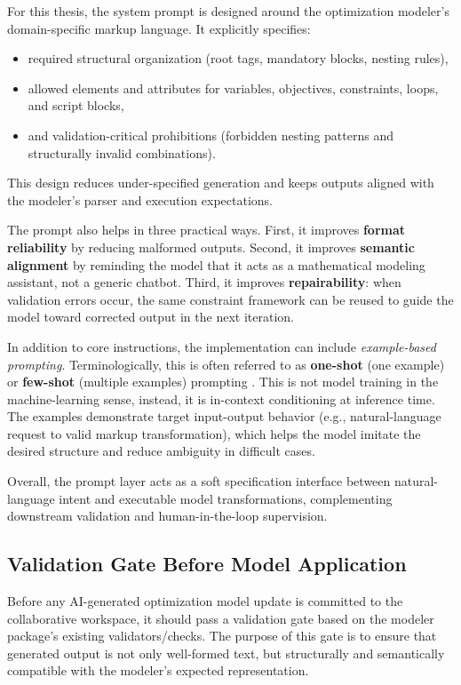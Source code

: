 For this thesis, the system prompt is designed around the optimization modeler's domain-specific markup language. It explicitly specifies:
\begin{itemize}
    \item required structural organization (root tags, mandatory blocks, nesting rules),
    \item allowed elements and attributes for variables, objectives, constraints, loops, and script blocks,
    \item and validation-critical prohibitions (forbidden nesting patterns and structurally invalid combinations).
\end{itemize}
This design reduces under-specified generation and keeps outputs aligned with the modeler's parser and execution expectations.

The prompt also helps in three practical ways. First, it improves \textbf{format reliability} by reducing malformed outputs. Second, it improves \textbf{semantic alignment} by reminding the model that it acts as a mathematical modeling assistant, not a generic chatbot. Third, it improves \textbf{repairability}: when validation errors occur, the same constraint framework can be reused to guide the model toward corrected output in the next iteration.

In addition to core instructions, the implementation can include \emph{example-based prompting}. Terminologically, this is often referred to as \textbf{one-shot} (one example) or \textbf{few-shot} (multiple examples) prompting \cite{brown2020languagemodelsfewshotlearners}. This is not model training in the machine-learning sense, instead, it is in-context conditioning at inference time. The examples demonstrate target input-output behavior (e.g., natural-language request to valid markup transformation), which helps the model imitate the desired structure and reduce ambiguity in difficult cases.

Overall, the prompt layer acts as a soft specification interface between natural-language intent and executable model transformations, complementing downstream validation and human-in-the-loop supervision.

\subsection{Validation Gate Before Model Application}
Before any AI-generated optimization model update is committed to the collaborative workspace, it should pass a validation gate based on the modeler package's existing validators/checks. The purpose of this gate is to ensure that generated output is not only well-formed text, but structurally and semantically compatible with the modeler's expected representation.

